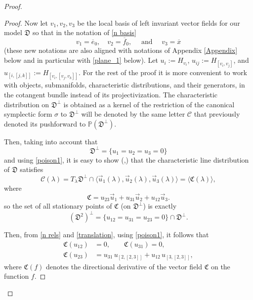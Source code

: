 \documentclass[11pt,letterpaper]{amsart}
\numberwithin{equation}{section}
\newcommand{\oline}{\overline}
\begin{document}
\begin{proof}
\begin{proof}
Now let $v_1, v_2, v_3$ be the local basis of left invariant vector fields for our model $\mathfrak D$ so that in the notation of \eqref{n basis} 
\begin{equation}
\label{translation}
v_1=\oline e_0, \quad v_2=\oline f_0, \quad \textrm{ and } \quad  v_3=\oline x
\end{equation}
(these new notations are also aligned with notations of Appendix \ref{Appendix} below and in particular with \eqref{plane_1} below).
Let $u_i:=H_{v_i}$, $u_{ij}:=H_{[v_i, v_j]}$, and
$u_{[i,[j,k]]}:=H_{[v_i, [v_j,v_k]]}$.
For the rest of the proof it is more convenient to work with objects, submanifolds, characteristic distributions, and their generators, in the cotangent bundle instead of its projectivization. The characteristic distribution on $\mathfrak D^\perp$ is obtained as a kernel of the restriction of the canonical symplectic form $\sigma$ to $\mathfrak D^\perp$ will be denoted by the same letter $\mathcal C$ that previously denoted its pushforward to $\mathbb P (\mathfrak D^\perp)$.

Then, taking into account that
$$\mathfrak D^\perp=\{u_1=u_2=u_3=0\}$$
and using \eqref{poison1}, it is easy to show (\cite[Lemma 1]{doubrov2008rank3},\cite{doubrov2016JacobiCurves}) that the characteristic line distribution of $\mathfrak D$ satisfies 
\begin{equation}
\label{H_D_intersection}
\mathcal C(\lambda) =T_\lambda \mathfrak D^\perp\cap \langle \vec u_1(\lambda), \vec u_2(\lambda), \vec u_3(\lambda)  \rangle =\langle \mathfrak C(\lambda)\rangle,
\end{equation}
where
\begin{equation}
\label{Characteristic_rank3}
\mathfrak C=u_{23}\vec u_1+u_{31} \vec u_2+u_{12}\vec u_3.
\end{equation}
so the set  of all stationary points of $\mathfrak C$ (on $\mathfrak D^\perp$) is exactly 
\begin{equation}
\label{D^2_perp_u}
(\mathfrak D^2)^\perp=\{u_{12}=u_{31}=u_{23}=0\}\cap \mathfrak D^\perp.
\end{equation}

Then, from \eqref{n rels} and \eqref{translation}, using \eqref{poison1}, it follows that
\begin{align}
\mathfrak C(u_{12}) &= 0, \qquad \mathfrak C(u_{31}) = 0, \label{u_with_1}\\
\mathfrak C(u_{23}) &= u_{31}\,u_{[2,[2,3]]} + u_{12}\,u_{[3,[2,3]]}\label{u_23},
\end{align}
where $\mathfrak C(f)$ denotes the directional derivative of the vector field $\mathfrak C$ on the function $f$.


\end{proof}
\end{proof}
\end{document}
